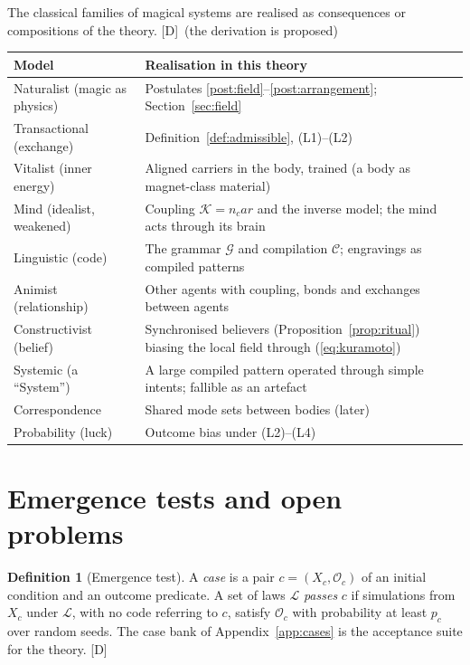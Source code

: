 \documentclass[11pt,a4paper]{article}
\numberwithin{equation}{section}
\theoremstyle{definition}
\newtheorem{definition}{Definition}[section]
\theoremstyle{plain}
\theoremstyle{remark}
\newcommand{\tagD}{\textcolor{tag}{\textsf{[D]}}}
\begin{document}
The classical families of magical systems are realised as consequences or compositions of the theory. \tagD\ (the derivation is proposed)
\begin{center}\small
\begin{tabularx}{\textwidth}{@{}>{\raggedright\arraybackslash}p{}>{\raggedright\arraybackslash}X@{}}
\toprule
Model & Realisation in this theory\\
\midrule
Naturalist (magic as physics) & Postulates \ref{post:field}--\ref{post:arrangement}; Section~\ref{sec:field}\\
Transactional (exchange) & Definition~\ref{def:admissible}, (L1)--(L2)\\
Vitalist (inner energy) & Aligned carriers in the body, trained (a body as magnet-class material)\\
Mind (idealist, weakened) & Coupling $\mathcal K=n_c a r$ and the inverse model; the mind acts through its brain\\
Linguistic (code) & The grammar $\mathcal G$ and compilation $\mathcal C$; engravings as compiled patterns\\
Animist (relationship) & Other agents with coupling, bonds and exchanges between agents\\
Constructivist (belief) & Synchronised believers (Proposition~\ref{prop:ritual}) biasing the local field through (\ref{eq:kuramoto})\\
Systemic (a ``System'') & A large compiled pattern operated through simple intents; fallible as an artefact\\
Correspondence & Shared mode sets between bodies (later)\\
Probability (luck) & Outcome bias under (L2)--(L4)\\
\bottomrule
\end{tabularx}
\end{center}

\section{Emergence tests and open problems}

\begin{definition}[Emergence test]\label{def:emergence}
A \emph{case} is a pair $c=(X_c,\mathcal O_c)$ of an initial condition and an outcome predicate. A set of laws $\mathcal L$ \emph{passes} $c$ if simulations from $X_c$ under $\mathcal L$, with no code referring to $c$, satisfy $\mathcal O_c$ with probability at least $p_c$ over random seeds. The case bank of Appendix~\ref{app:cases} is the acceptance suite for the theory. \tagD
\end{definition}
\end{document}
